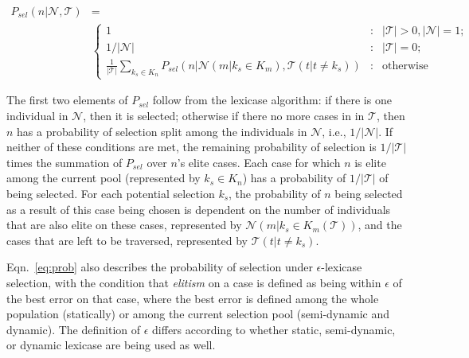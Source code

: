 \documentclass[preprint]{article}
\begin{document}
{\scriptsize
\begin{align}\label{eq:prob}
P_{sel}(n | \mathcal{N}, \mathcal{T}) &= \\
 &\left\{\nonumber 
     \begin{array}{lcr}
       1 & : & |\mathcal{T}| >0, |\mathcal{N}| = 1; \\
       1/|\mathcal{N}| & : &|\mathcal{T}| = 0; \\ 
       \frac{1}{|\mathcal{T}|}\sum_{k_s \in K_n}{P_{sel} \left( n | \mathcal{N}(m|k_s \in K_m), \mathcal{T}(t|t \neq k_s) \right)} & : & \text{otherwise}
     \end{array}
   \right. 
\end{align}
}

The first two elements of $P_{sel}$ follow from the lexicase algorithm: if there is one individual in $\mathcal{N}$, then it is selected; otherwise if there no more cases in in $\mathcal{T}$, then $n$ has a probability of selection split among the individuals in $\mathcal{N}$, i.e.,  $1/|\mathcal{N}|$. If neither of these conditions are met, the remaining probability of selection is $1/|\mathcal{T}|$ times the summation of $P_{sel}$ over $n$'s elite cases. Each case for which $n$ is elite among the current pool (represented by $k_s \in K_n$) has a probability of $1/|\mathcal{T}|$ of being selected. For each potential selection $k_s$, the probability of $n$ being selected as a result of this case being chosen is dependent on the number of individuals that are also elite on these cases, represented by $\mathcal{N}(m|k_s \in K_m(\mathcal{T}))$, and the cases that are left to be traversed, represented by $\mathcal{T}(t|t \neq k_s)$. 

Eqn.~\ref{eq:prob} also describes the probability of selection under $\epsilon$-lexicase selection, with the condition that {\it elitism} on a case is defined as being within $\epsilon$ of the best error on that case, where the best error is defined among the whole population (statically) or among the current selection pool (semi-dynamic and dynamic). The definition of $\epsilon$ differs according to whether static, semi-dynamic, or dynamic lexicase are being used as well.   
\end{document}
